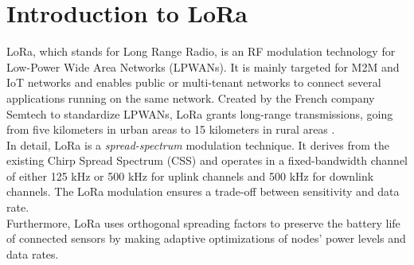 \section{Introduction to LoRa}
\label{lora}
LoRa, which stands for Long Range Radio, is an RF modulation technology for Low-Power Wide Area Networks (LPWANs). It is mainly targeted for M2M and IoT networks and enables public or multi-tenant networks to connect several applications running on the same network. Created by the French company Semtech \cite{8075570} to standardize LPWANs, LoRa grants long-range transmissions, going from five kilometers in urban areas to 15 kilometers in rural areas \cite{lora_developer_portal}.
\\
In detail, LoRa is a \textit{spread-spectrum} modulation technique. It derives from the existing Chirp Spread Spectrum (CSS) and operates in a fixed-bandwidth channel of either 125 kHz or 500 kHz for uplink channels and 500 kHz for downlink channels. The LoRa modulation ensures a trade-off between sensitivity and data rate. 
\\
Furthermore, LoRa uses orthogonal spreading factors to preserve the battery life of connected sensors by making adaptive optimizations of nodes' power levels and data rates.

